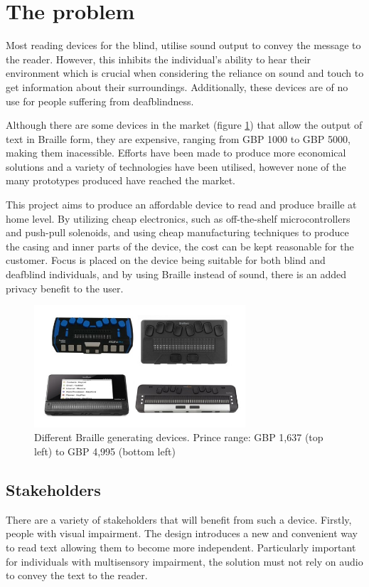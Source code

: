 \section{The problem}
Most reading devices for the blind, utilise sound output to convey the message to the reader.
However, this inhibits the individual's ability to hear their environment which is crucial when considering the reliance on sound and touch to get information about their surroundings.
Additionally, these devices are of no use for people suffering from deafblindness.

Although there are some devices in the market (figure \ref{fig:braille-readers-examples}) that allow the output of text in Braille form, they are expensive, ranging from GBP 1000 to GBP 5000, making them inacessible. Efforts have been made to produce more economical solutions and a variety of technologies have been utilised, however none of the many prototypes produced have reached the market.

This project aims to produce an affordable device to read and produce braille at home level.
By utilizing cheap electronics, such as off-the-shelf microcontrollers and push-pull solenoids, and using cheap manufacturing techniques to produce the casing and inner parts of the device, the cost can be kept reasonable for the customer.
Focus is placed on the device being suitable for both blind and deafblind individuals, and by using Braille instead of sound, there is an added privacy benefit to the user.
\begin{figure}[h]
\centering
    \includegraphics[width=0.7\textwidth]{figures/braille-readers-examples.jpg}
\caption{Different Braille generating devices. Prince range: GBP 1,637 (top left) to GBP 4,995 (bottom left)}
\label{fig:braille-readers-examples}
\end{figure}

\subsection{Stakeholders}
There are a variety of stakeholders that will benefit from such a device.
Firstly, people with visual impairment.
The design introduces a new and convenient way to read text allowing them to become more independent.
Particularly important for individuals with multisensory impairment, the solution must not rely on audio to convey the text to the reader.

